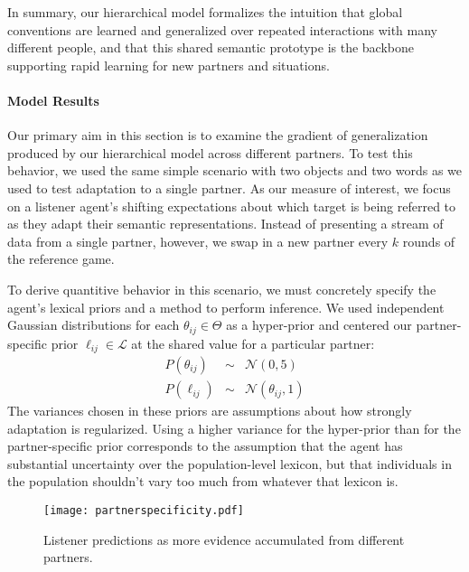 In summary, our hierarchical model formalizes the intuition that global conventions are learned and generalized over repeated interactions with many different people, and that this shared semantic prototype is the backbone supporting rapid learning for new partners and situations. 

\paragraph{Model Results}

Our primary aim in this section is to examine the gradient of generalization produced by our hierarchical model across different partners.
To test this behavior, we used the same simple scenario with two objects and two words as we used to test adaptation to a single partner.
As our measure of interest, we focus on a listener agent's shifting expectations about which target is being referred to as they adapt their semantic representations.
Instead of presenting a stream of data from a single partner, however, we swap in a new partner every $k$ rounds of the reference game.

To derive quantitive behavior in this scenario, we must concretely specify the agent's lexical priors and a method to perform inference.
We used independent Gaussian distributions for each $\theta_{ij} \in \Theta$ as a hyper-prior and centered our partner-specific prior $\ell_{ij} \in \mathcal{L}$ at the shared value for a particular partner:
$$\begin{array}{rcl}
P(\theta_{ij}) & \sim & \mathcal{N}(0, 5)\\
P(\ell_{ij}) & \sim & \mathcal{N}(\theta_{ij}, 1)
\end{array}$$
The variances chosen in these priors are assumptions about how strongly adaptation is regularized. 
Using a higher variance for the hyper-prior than for the partner-specific prior corresponds to the assumption that the agent has substantial uncertainty over the population-level lexicon, but that individuals in the population shouldn't vary too much from whatever that lexicon is.

\begin{figure}
\centering
    \texttt{[image: partnerspecificity.pdf]}
  \caption{Listener predictions as more evidence accumulated from different partners.}
  \label{fig:specificity}
\end{figure}

